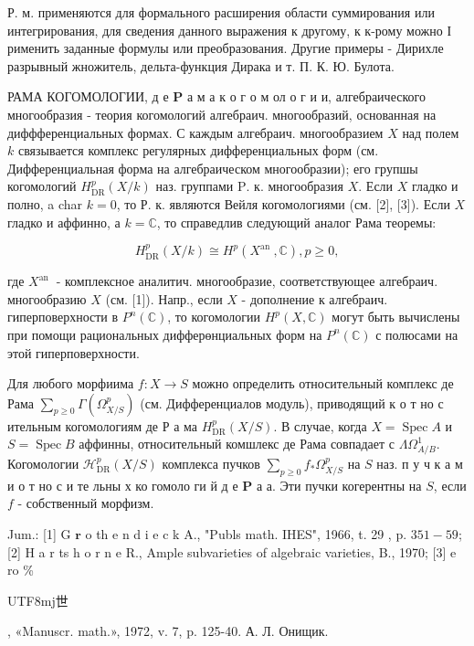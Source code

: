 \documentclass[10pt]{article}
\begin{document}
Р. м. применяются для формального расширения области суммирования или интегрирования, для сведения данного выражения к другому, к к-рому можно І рименить заданные формулы или преобразования. Другие примеры - Дирихле разрывный жножитель, дельта-функция Дирака и т. П. К. Ю. Булота.



РАМА КОГОМОЛОГИИ, д е $\mathbf{P}$ а м а к о г о м ол о г и и, алгебраического многообразия - теория когомологий алгебраич. многообразий, основанная на диффференциальных формах. С каждым алгебраич. многообразием $X$ над полем $k$ связывается комплекс регулярных дифференциальных форм (см. Дифференциальная форма на алгебраическом многообразии); его групшы когомологий $H_{\mathrm{DR}}^{p}(X / k)$ наз. группами $\mathrm{P}$. к. многообразия $X$. Если $X$ гладко и полно, a char $k=0$, то Р. к. являются Вейля когомологиями (см. [2], [3]). Если $X$ гладко и аффинно, а $k=\mathbb{C}$, то справедлив следующий аналог Рама теоремы:



\[

H_{\mathrm{DR}}^{p}(X / k) \cong H^{p}\left(X^{\text {an }}, \mathbb{C}\right), p \geqslant 0,

\]



где $X^{\text {an }}$ - комплексное аналитич. многообразие, соответствующее алгебраич. многообразию $X$ (см. [1]). Напр., если $X$ - дополнение к алгебраич. гиперповерхности в $P^{n}(\mathbb{C})$, то когомологии $H^{p}(X, \mathbb{C})$ могут быть вычислены при помощи рациональных дифферөнциальных форм на $P^{n}(\mathbb{C})$ с полюсами на этой гиперповерхности.



Для любого морфиима $f: X \rightarrow S$ можно определить относительный комплекс де Рама $\sum_{p \geqslant 0} \Gamma\left(\Omega_{X / S}^{p}\right)$ (см. Дифференциалов модуль), приводящий к о т но с ительным когомологиям де Р а ма $H_{\mathrm{DR}}^{p}(X / S)$. В случае, когда $X=\operatorname{Spec} A$ и $S=\operatorname{Spec} B$ аффинны, относительный комшлекс де Рама совпадает с $\Lambda \Omega_{A / B}^{1}$. Когомологии $\mathscr{H}_{\mathrm{DR}}^{p}(X / S)$ комплекса пучков $\sum_{p \geqslant 0} f_{*} \Omega_{X / S}^{p}$ на $S$ наз. п у ч к а м и о т но с и те льны х ко гомоло ги й д е $\mathbf{P}$ а а. Эти пучки когерентны на $S$, если $f$ - собственный морфизм.



Jum.: [1] G $\mathbf{r}$ o th e n d i e c k A., "Publs math. IHES", 1966, t. 29 , p. $351-59$; [2] H a r ts h o r n e R., Ample subvarieties of algebraic varieties, B., 1970; [3] e ro \% \begin{CJK}{UTF8}{mj}世\end{CJK}, «Manuscr. math.», 1972, v. 7, p. 125-40. А. Л. Онищик.
\end{document}
